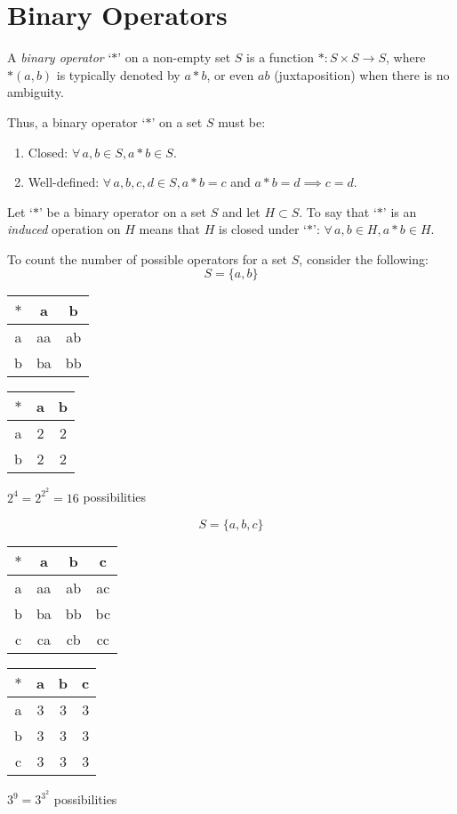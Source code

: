\documentclass[letterpaper,12pt,fleqn]{article}
\begin{document}
\section*{Binary Operators}

\begin{definition}
  A \emph{binary operator} `$*$' on a non-empty set $S$ is a function
  $*:S\times S\to S$, where $*(a,b)$ is typically denoted by $a*b$, or even
  $ab$ (juxtaposition) when there is no ambiguity.
\end{definition}

Thus, a binary operator `$*$' on a set $S$ must be:
\begin{enumerate}
\item Closed: $\forall\,a,b\in S,a*b\in S$.
\item Well-defined: $\forall\,a,b,c,d\in S,a*b=c$ and $a*b=d\implies c=d$.
\end{enumerate}

\begin{definition}
  Let `$*$' be a binary operator on a set $S$ and let $H\subset S$. To say that
  `$*$' is an \emph{induced} operation on $H$ means that $H$ is closed under
  `$*$': $\forall\,a,b\in H,a*b\in H$.
\end{definition}

To count the number of possible operators for a set $S$, consider the
following:
\[S=\{a,b\}\]

\begin{tabular}{c|cc}
  $*$ & a & b \\
  \hline
  a & aa & ab \\
  b & ba & bb \\
\end{tabular}\hspace{0.25in}
\begin{tabular}{c|cc}
  $*$ & a & b \\
  \hline
  a & 2 & 2 \\
  b & 2 & 2 \\
\end{tabular}\hspace{0.25in}
$2^4=2^{2^2}=16$ possibilities

\[S=\{a,b,c\}\]
\begin{tabular}{c|ccc}
  $*$ & a & b & c \\
  \hline
  a & aa & ab & ac \\
  b & ba & bb & bc \\
  c & ca & cb & cc \\
\end{tabular}\hspace{0.25in}
\begin{tabular}{c|ccc}
  $*$ & a & b & c\\
  \hline
  a & 3 & 3 & 3 \\
  b & 3 & 3 & 3 \\
  c & 3 & 3 & 3 \\
\end{tabular}\hspace{0.25in}
$3^9=3^{3^2}$ possibilities
\end{document}

